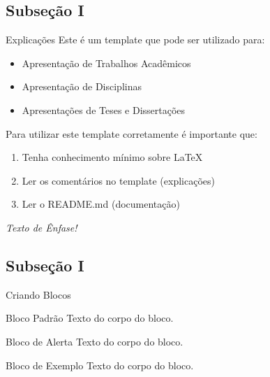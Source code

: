 \documentclass{libs/ufrb_format}
\begin{document}
\subsection{Subseção I}
\begin{frame}{Explicações}
    Este é um template que pode ser utilizado para:
    \begin{itemize}
        \item Apresentação de Trabalhos Acadêmicos
        \item Apresentação de Disciplinas
        \item Apresentações de Teses e Dissertações
    \end{itemize}

    \vspace{0.4cm} %
    
    Para utilizar este template corretamente é importante que:
    \begin{enumerate}
        \item Tenha conhecimento mínimo sobre LaTeX
        \item Ler os comentários no template (explicações)
        \item Ler o README.md (documentação)
    \end{enumerate}

    \vspace{0.2cm}

     \emph{Texto de Ênfase!}
\end{frame}

\subsection{Subseção I}
\begin{frame}{Criando Blocos}
    \begin{block}{Bloco Padrão}
        Texto do corpo do bloco.
    \end{block}

    \begin{alertblock}{Bloco de Alerta}
        Texto do corpo do bloco.
    \end{alertblock}

    \begin{exampleblock}{Bloco de Exemplo}
        Texto do corpo do bloco.
    \end{exampleblock}   
\end{frame}
\end{document}
